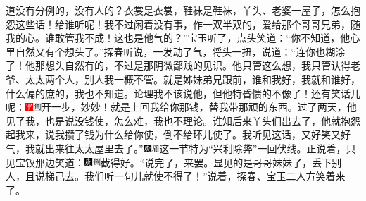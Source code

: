 道没有分例的，没有人的？衣裳是衣裳，鞋袜是鞋袜，丫头、老婆一屋子，怎么抱怨这些话！给谁听呢！我不过闲着没有事，作一双半双的，爱给那个哥哥兄弟，随我的心。谁敢管我不成！这也是他气的？''宝玉听了，点头笑道：``你不知道，他心里自然又有个想头了。''探春听说，一发动了气，将头一扭，说道：``连你也糊涂了！他那想头自然有的，不过是那阴微鄙贱的见识。他只管这么想，我只管认得老爷、太太两个人，别人我一概不管。就是姊妹弟兄跟前，谁和我好，我就和谁好，什么偏的庶的，我也不知道。论理我不该说他，但他特昏愦的不像了！还有笑话儿呢：{\includegraphics[width=3mm]{../Images/00002}\includegraphics[width=3mm]{../Images/00011}\footnotesize \kaishu 开一步，妙妙！}就是上回我给你那钱，替我带那顽的东西。过了两天，他见了我，也是说没钱使，怎么难，我也不理论。谁知后来丫头们出去了，他就抱怨起我来，说我攒了钱为什么给你使，倒不给环儿使了。我听见这话，又好笑又好气，我就出来往太太屋里去了。''{\includegraphics[width=3mm]{../Images/00004}\includegraphics[width=3mm]{../Images/00010}\footnotesize \kaishu 这一节特为``兴利除弊''一回伏线。}正说着，只见宝钗那边笑道：{\includegraphics[width=3mm]{../Images/00004}\includegraphics[width=3mm]{../Images/00011}\footnotesize \kaishu 截得好。}``说完了，来罢。显见的是哥哥妹妹了，丢下别人，且说梯己去。我们听一句儿就使不得了！''说着，探春、宝玉二人方笑着来了。

